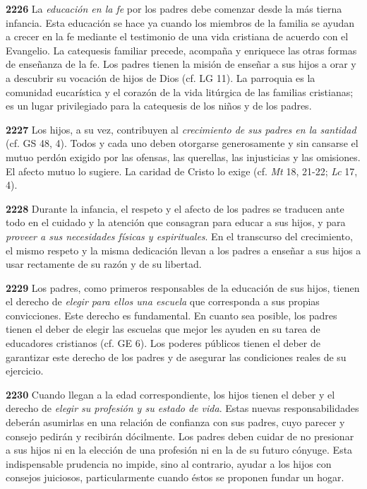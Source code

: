 \begin{body}
\begin{body}
\textbf{2226} La \emph{educación en la fe} por los padres debe comenzar desde la más tierna infancia. Esta educación se hace ya cuando los miembros de la familia se ayudan a crecer en la fe mediante el testimonio de una vida cristiana de acuerdo con el Evangelio. La catequesis familiar precede, acompaña y enriquece las otras formas de enseñanza de la fe. Los padres tienen la misión de enseñar a sus hijos a orar y a descubrir su vocación de hijos de Dios (cf. LG 11). La parroquia es la comunidad eucarística y el corazón de la vida litúrgica de las familias cristianas; es un lugar privilegiado para la catequesis de los niños y de los padres.

\textbf{2227} Los hijos, a su vez, contribuyen al \emph{crecimiento de sus padres en la santidad} (cf. GS 48, 4). Todos y cada uno deben otorgarse generosamente y sin cansarse el mutuo perdón exigido por las ofensas, las querellas, las injusticias y las omisiones. El afecto mutuo lo sugiere. La caridad de Cristo lo exige (cf. \emph{Mt} 18, 21-22; \emph{Lc} 17, 4).

\textbf{2228} Durante la infancia, el respeto y el afecto de los padres se traducen ante todo en el cuidado y la atención que consagran para educar a sus hijos, y para \emph{proveer a sus necesidades físicas y espirituales}. En el transcurso del crecimiento, el mismo respeto y la misma dedicación llevan a los padres a enseñar a sus hijos a usar rectamente de su razón y de su libertad.

\textbf{2229} Los padres, como primeros responsables de la educación de sus hijos, tienen el derecho de \emph{elegir para ellos una escuela} que corresponda a sus propias convicciones. Este derecho es fundamental. En cuanto sea posible, los padres tienen el deber de elegir las escuelas que mejor les ayuden en su tarea de educadores cristianos (cf. GE 6). Los poderes públicos tienen el deber de garantizar este derecho de los padres y de asegurar las condiciones reales de su ejercicio.

\textbf{2230} Cuando llegan a la edad correspondiente, los hijos tienen el deber y el derecho de \emph{elegir su profesión y su estado de vida}. Estas nuevas responsabilidades deberán asumirlas en una relación de confianza con sus padres, cuyo parecer y consejo pedirán y recibirán dócilmente. Los padres deben cuidar de no presionar a sus hijos ni en la elección de una profesión ni en la de su futuro cónyuge. Esta indispensable prudencia no impide, sino al contrario, ayudar a los hijos con consejos juiciosos, particularmente cuando éstos se proponen fundar un hogar.


\end{body}
\end{body}

